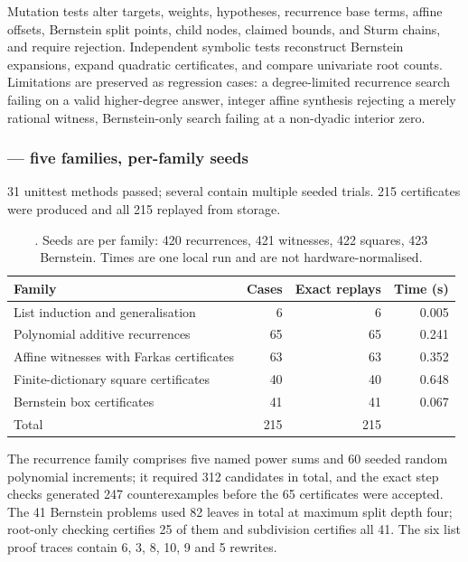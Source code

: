 Mutation tests alter targets, weights, hypotheses, recurrence base terms, affine
offsets, Bernstein split points, child nodes, claimed bounds, and Sturm chains,
and require rejection. Independent symbolic tests reconstruct Bernstein
expansions, expand quadratic certificates, and compare univariate root counts.
Limitations are preserved as regression cases: a degree-limited recurrence
search failing on a valid higher-degree answer, integer affine synthesis
rejecting a merely rational witness, Bernstein-only search failing at a
non-dyadic interior zero.

\subsubsection*{ --- five families, per-family seeds}

31 unittest methods passed; several contain multiple seeded trials. 215
certificates were produced and all 215 replayed from storage.

\begin{table}[htbp]
\centering\small
\begin{tabular}{@{}lrrr@{}}
\toprule
Family & Cases & Exact replays & Time (s) \\
\midrule
List induction and generalisation & 6 & 6 & 0.005 \\
Polynomial additive recurrences & 65 & 65 & 0.241 \\
Affine witnesses with Farkas certificates & 63 & 63 & 0.352 \\
Finite-dictionary square certificates & 40 & 40 & 0.648 \\
Bernstein box certificates & 41 & 41 & 0.067 \\
\midrule
Total & 215 & 215 & \\
\bottomrule
\end{tabular}
\caption{. Seeds are per family: 420 recurrences, 421 witnesses,
422 squares, 423 Bernstein. Times are one local run and are not
hardware-normalised.}
\label{tab:p2}
\end{table}

The recurrence family comprises five named power sums and 60 seeded random
polynomial increments; it required 312 candidates in total, and the exact step
checks generated 247 counterexamples before the 65 certificates were accepted.
The 41 Bernstein problems used 82 leaves in total at maximum split depth four;
root-only checking certifies 25 of them and subdivision certifies all 41. The
six list proof traces contain 6, 3, 8, 10, 9 and 5 rewrites.


